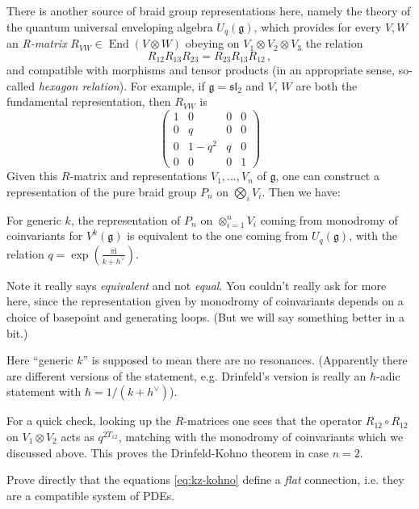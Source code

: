 \documentclass[12pt,letterpaper,reqno]{amsart}
\numberwithin{equation}{section}
\newcommand{\fg}{{\mathfrak g}}
\newcommand{\fsl}{{\mathfrak {sl}}}
\newcommand{\I}{{\mathrm i}}
\newcommand{\ti}[1]{\textit{#1}}
\DeclareMathOperator{\End}{End}
\begin{document}
\begin{example}
There is another source of braid group
representations here, namely the theory of the quantum universal enveloping algebra $U_q(\fg)$,
which provides for every $V,W$ an \ti{R-matrix} $R_{VW} \in \End(V \otimes W)$
obeying on $V_1 \otimes V_2 \otimes V_3$ the relation
\begin{equation}
  R_{12} R_{13} R_{23} = R_{23} R_{13} R_{12} \, ,
\end{equation}
and compatible with morphisms and tensor products (in an appropriate sense, so-called \ti{hexagon relation}).
For example, if $\fg = \fsl_2$ and $V$, $W$ are both the fundamental representation, then $R_{VW}$ is
\begin{equation}
  \begin{pmatrix} 1 & 0 & 0 & 0 \\ 0 & q & 0 & 0 \\ 0 & 1-q^2 & q & 0 \\ 0 & 0 & 0 & 1 \end{pmatrix}
\end{equation}
Given this $R$-matrix and representations $V_1, \dots, V_n$ of $\fg$,
one can construct a representation of the pure braid group $P_n$ on $\bigotimes_i V_i$.
Then we have:
\begin{thm}
For generic $k$, the representation of $P_n$ on $\otimes_{i=1}^n V_i$ coming from monodromy of coinvariants for $V^k(\fg)$
is equivalent to the one coming from $U_q(\fg)$, with the relation $q = \exp( \frac{\pi \I}{k + h^\vee} )$.
\end{thm}

Note it really says \ti{equivalent} and not \ti{equal}. You couldn't really ask for more here, 
since the representation given by monodromy of coinvariants depends on a choice of basepoint and
generating loops. (But we will say something better in a bit.)

Here ``generic $k$'' is supposed to mean there are no resonances.
(Apparently there are different versions of the statement, e.g. Drinfeld's version is
really an $\hbar$-adic statement with $\hbar = 1 / (k + h^\vee)$).

For a quick check, looking up the $R$-matrices one sees that 
the operator $R_{12} \circ R_{12}$ on $V_1 \otimes V_2$
acts as $q^{2 T_{12}}$,
matching with the monodromy of coinvariants which we discussed above. 
This proves the Drinfeld-Kohno theorem in case $n=2$.

\end{example}

\begin{exercise}
Prove directly that the equations \eqref{eq:kz-kohno} define a \ti{flat} connection,
i.e. they are a compatible system of PDEs.
\end{exercise}
\end{document}

